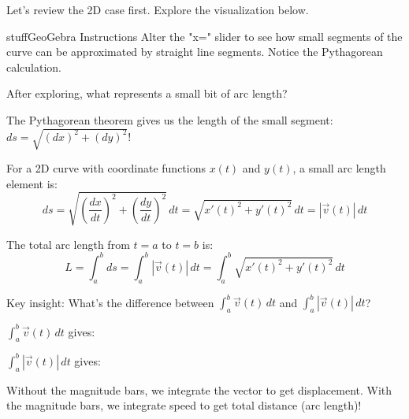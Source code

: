 \documentclass{ximera}
\begin{document}
\begin{problem}
Let's review the 2D case first. Explore the visualization below.

\begin{expandable}{stuff}{GeoGebra Instructions}
    Alter the "x=" slider to see how small segments of the curve can be approximated by straight line segments. Notice the Pythagorean calculation.
\end{expandable}

\begin{center}
\end{center}

After exploring, what represents a small bit of arc length?
\begin{multipleChoice}
\end{multipleChoice}

\begin{feedback}
The Pythagorean theorem gives us the length of the small segment: $ds = \sqrt{(dx)^2 + (dy)^2}$!
\end{feedback}
\end{problem}

\begin{definition}
For a 2D curve with coordinate functions $x(t)$ and $y(t)$, a small arc length element is:
$$ds=\sqrt{\left(\frac{dx}{dt}\right)^2+\left(\frac{dy}{dt}\right)^2} \, dt=\sqrt{x'(t)^2+y'(t)^2} \, dt = |\vec{v}(t)| \, dt$$

The total arc length from $t=a$ to $t=b$ is:
$$L = \int_a^b ds = \int_a^b |\vec{v}(t)| \, dt = \int_a^b \sqrt{x'(t)^2+y'(t)^2} \, dt$$
\end{definition}

\begin{problem}
Key insight: What's the difference between $\int_a^b \vec{v}(t) \, dt$ and $\int_a^b |\vec{v}(t)| \, dt$?

$\int_a^b \vec{v}(t) \, dt$ gives:
\begin{multipleChoice}
\end{multipleChoice}

$\int_a^b |\vec{v}(t)| \, dt$ gives:
\begin{multipleChoice}
\end{multipleChoice}

\begin{feedback}
Without the magnitude bars, we integrate the vector to get displacement. With the magnitude bars, we integrate speed to get total distance (arc length)!
\end{feedback}
\end{problem}
\end{document}

